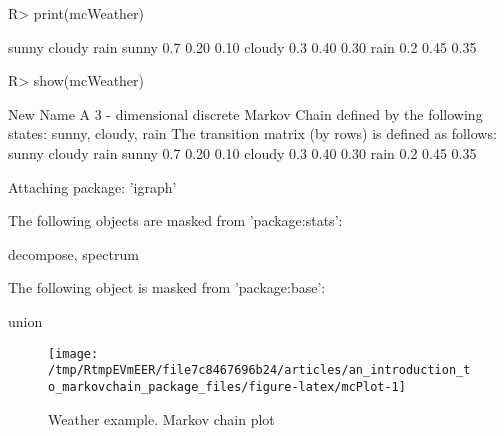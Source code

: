 \documentclass[
  nojss]{jss}
\begin{document}
\begin{CodeChunk}

\begin{CodeInput}
R> print(mcWeather)
\end{CodeInput}

\begin{CodeOutput}
       sunny cloudy rain
sunny    0.7   0.20 0.10
cloudy   0.3   0.40 0.30
rain     0.2   0.45 0.35
\end{CodeOutput}

\begin{CodeInput}
R> show(mcWeather)
\end{CodeInput}

\begin{CodeOutput}
New Name 
 A  3 - dimensional discrete Markov Chain defined by the following states: 
 sunny, cloudy, rain 
 The transition matrix  (by rows)  is defined as follows: 
       sunny cloudy rain
sunny    0.7   0.20 0.10
cloudy   0.3   0.40 0.30
rain     0.2   0.45 0.35
\end{CodeOutput}
\end{CodeChunk}

\begin{CodeChunk}

\begin{CodeOutput}

Attaching package: 'igraph'
\end{CodeOutput}

\begin{CodeOutput}
The following objects are masked from 'package:stats':

    decompose, spectrum
\end{CodeOutput}

\begin{CodeOutput}
The following object is masked from 'package:base':

    union
\end{CodeOutput}
\begin{figure}

{\centering \texttt{[image: /tmp/RtmpEVmEER/file7c8467696b24/articles/an\_introduction\_to\_markovchain\_package\_files/figure-latex/mcPlot-1]} 

}

\caption[Weather example]{Weather example. Markov chain plot}\label{fig:mcPlot}
\end{figure}
\end{CodeChunk}
\end{document}

